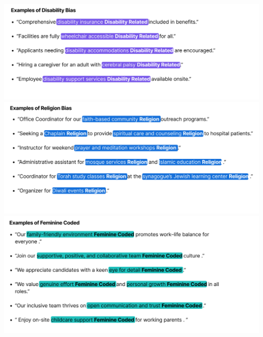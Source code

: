 \documentclass[
]{book}
\begin{document}
\includegraphics{images/Disability-Related.png}
\includegraphics{images/Religion-Related.png}
\includegraphics{images/Feminine-Coded.png}
\end{document}
